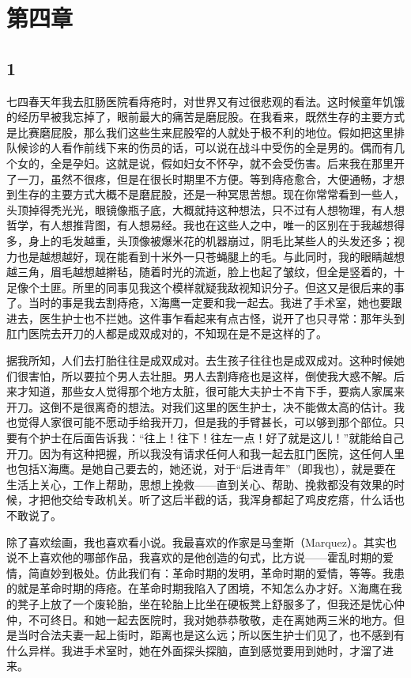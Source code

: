 \section{第四章}

\subsection{1}

七四春天年我去肛肠医院看痔疮时，对世界又有过很悲观的看法。这时候童年饥饿的经历早被我忘掉了，眼前最大的痛苦是磨屁股。在我看来，既然生存的主要方式是比赛磨屁股，那么我们这些生来屁股窄的人就处于极不利的地位。假如把这里排队候诊的人看作前线下来的伤员的话，可以说在战斗中受伤的全是男的。偶而有几个女的，全是孕妇。这就是说，假如妇女不怀孕，就不会受伤害。后来我在那里开了一刀，虽然不很疼，但是在很长时期里不方便。等到痔疮愈合，大便通畅，才想到生存的主要方式大概不是磨屁股，还是一种冥思苦想。现在你常常看到一些人，头顶掉得秃光光，眼镜像瓶子底，大概就持这种想法，只不过有人想物理，有人想哲学，有人想推背图，有人想易经。我也在这些人之中，唯一的区别在于我越想得多，身上的毛发越重，头顶像被爆米花的机器崩过，阴毛比某些人的头发还多；视力也是越想越好，现在能看到十米外一只苍蝇腿上的毛。与此同时，我的眼睛越想越三角，眉毛越想越擀毡，随着时光的流逝，脸上也起了皱纹，但全是竖着的，十足像个土匪。所里的同事见我这个模样就疑我敌视知识分子。但这又是很后来的事了。当时的事是我去割痔疮，X海鹰一定要和我一起去。我进了手术室，她也要跟进去，医生护士也不拦她。这件事乍看起来有点古怪，说开了也只寻常：那年头到肛门医院去开刀的人都是成双成对的，不知现在是不是这样的了。 

据我所知，人们去打胎往往是成双成对。去生孩子往往也是成双成对。这种时候她们很害怕，所以要拉个男人去壮胆。男人去割痔疮也是这样，倒使我大惑不解。后来才知道，那些女人觉得那个地方太脏，很可能大夫护士不肯下手，要病人家属来开刀。这倒不是很离奇的想法。对我们这里的医生护士，决不能做太高的估计。我也觉得人家很可能不愿动手给我开刀，但是我的手臂甚长，可以够到那个部位。只要有个护士在后面告诉我：“往上！往下！往左一点！好了就是这儿！”就能给自己开刀。因为有这种把握，所以我没有请求任何人和我一起去肛门医院，这任何人里也包括X海鹰。是她自己要去的，她还说，对于“后进青年”（即我也），就是要在生活上关心，工作上帮助，思想上挽救——直到关心、帮助、挽救都没有效果的时候，才把他交给专政机关。听了这后半截的话，我浑身都起了鸡皮疙瘩，什么话也不敢说了。 

除了喜欢绘画，我也喜欢看小说。我最喜欢的作家是马奎斯（Marquez）。其实也说不上喜欢他的哪部作品，我喜欢的是他创造的句式，比方说——霍乱时期的爱情，简直妙到极处。仿此我们有：革命时期的发明，革命时期的爱情，等等。我患的就是革命时期的痔疮。在革命时期我陷入了困境，不知怎么办才好。X海鹰在我的凳子上放了一个废轮胎，坐在轮胎上比坐在硬板凳上舒服多了，但我还是忧心仲仲，不可终日。和她一起去医院时，我对她恭恭敬敬，走在离她两三米的地方。但是当时合法夫妻一起上街时，距离也是这么远；所以医生护士们见了，也不感到有什么异样。我进手术室时，她在外面探头探脑，直到感觉要用到她时，才溜了进来。 

